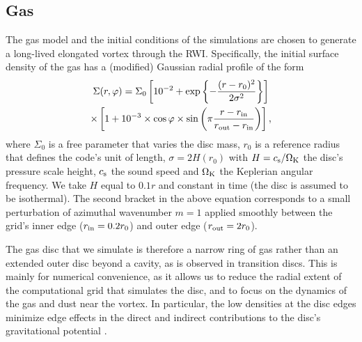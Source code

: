\documentclass[a4paper,usenatbib]{mnras}
\begin{document}
\subsection{Gas}
\label{sec:model_gas}
The gas model and the initial conditions of the simulations are chosen
to generate a long-lived elongated vortex through the
RWI. Specifically, the initial surface density of the gas has a
(modified) Gaussian radial profile of the form
%
\begin{multline}
  \Sigma(r,\varphi) = \Sigma_0 \left[10^{-2}
    + \exp\left\{-\frac{(r-r_0)^2}{2\sigma^2}\right\}\right]\nonumber\\
  \times\left[
    1+10^{-3}\times\cos\varphi\times\sin\left(\pi\frac{r-r_{\rm
          in}}{r_{\rm out}-r_{\rm in}}\right) \right],
          \label{eq:Sigma0}
\end{multline}
%
where $\Sigma_0$ is a free parameter that varies the disc mass, $r_0$
is a reference radius that defines the code's unit of length, $\sigma
= 2H(r_0)$ with $H=c_{\rm s} / \Omega_{\rm K}$ the disc's pressure
scale height, $c_{\rm s}$ the sound speed and $\Omega_{\rm K}$ the
Keplerian angular frequency. We take $H$ equal to $0.1r$ and constant
in time (the disc is assumed to be isothermal). The second bracket in
the above equation corresponds to a small perturbation of azimuthal
wavenumber $m=1$ applied smoothly between the grid's inner edge
($r_{\rm in} = 0.2r_0$) and outer edge ($r_{\rm out} = 2r_0$).

The gas disc that we simulate is therefore a narrow ring of gas rather
than an extended outer disc beyond a cavity, as is observed in
transition discs. This is mainly for numerical convenience, as it
allows us to reduce the radial extent of the computational grid that
simulates the disc, and to focus on the dynamics of the gas and dust
near the vortex. In particular, the low densities at the disc edges
minimize edge effects in the direct and indirect contributions to the
disc's gravitational potential \citep{HPS92,Adams89}.
\end{document}
